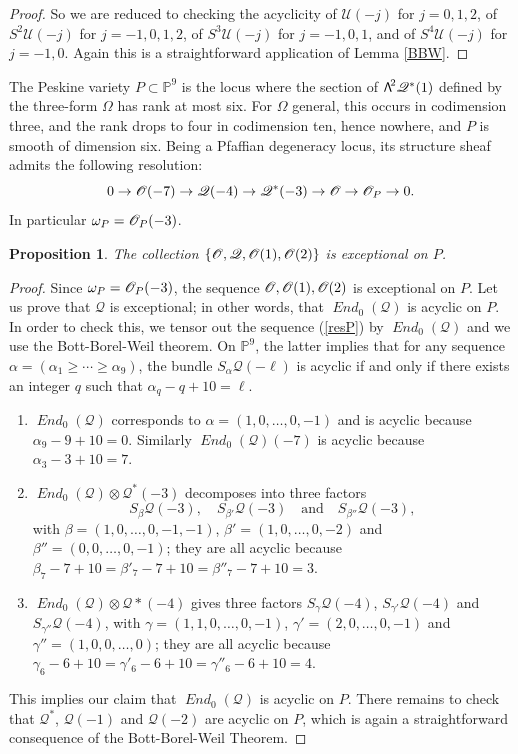 \documentclass[11pt]{article}
\newcommand\bw[1]{{\hbox{\large$\mathsf{\Lambda}$}^{\!#1}}}
\DeclareMathOperator{\iEnd}{\mathit{End}}
\let\mathcal\mathscr
\theoremstyle{plain}
\newtheorem{prop}[theorem]{Proposition}
\theoremstyle{definition}
\newcommand{\PP}{\mathbb{P}}
\newcommand{\sheaf}[1]{\mathcal{#1}}
\newcommand{\kq}{\sheaf{Q}}
\newcommand{\ku}{\sheaf{U}}
\begin{document}
\begin{proof}
So we are reduced to checking the acyclicity of $\ku(-j)$ for $j=0,1,2$, of $S^2\ku(-j)$
for $j=-1,0,1,2$, of $S^3\ku(-j)$ for $j=-1,0,1$, and of $S^4\ku(-j)$ for $j=-1,0$.
Again this is a straightforward application of Lemma \ref{BBW}.
\end{proof}

The Peskine variety $P\subset\PP^9$ is the locus where the section of $\bw2\kq^* (1)$
defined by the three-form $\Omega$ has rank at most six. For $\Omega$ general, this occurs
in codimension three, and the rank drops to four in codimension ten, hence nowhere, and
$P$ is smooth of dimension six. Being a Pfaffian degeneracy locus, its structure sheaf admits
the following resolution:\vspace*{-3pt}
\begin{equation*}\label{resP}
0\to \cO(-7)\to \kq(-4)\to \kq^* (-3)\to \cO\to\cO_P\to 0.
\end{equation*}
In particular $\omega_P=\cO_P(-3)$.

\begin{prop}\label{prop:exc-coll-on-P}
The collection $\{\cO, \kq, \cO(1), \cO(2)\}$ is exceptional on $P$.
\end{prop}

\begin{proof}
Since $\omega_P=\cO_P(-3)$, the sequence $\cO, \cO(1), \cO(2)$ is exceptional on $P$.
Let us prove that $\kq$ is exceptional; in other words, that $\iEnd_0(\kq)$ is acyclic on $P$.
In order to
check this, we tensor out the sequence (\ref{resP}) by $\iEnd_0(\kq)$ and we use
the Bott-Borel-Weil theorem. On $\PP^9$, the latter implies that for any sequence $\alpha
=(\alpha_1\ge\cdots\ge\alpha_9)$, the bundle $S_\alpha \kq (-\ell)$ is acyclic if and only if
there exists an integer $q$ such that $\alpha_{q}-q+10=\ell$.
\begin{enumerate}
\item $\iEnd_0(\kq)$ corresponds to $\alpha = (1,0,\dots,0,-1)$ and is acyclic because
$\alpha_{9}-9+10=0$. Similarly $\iEnd_0(\kq)(-7)$ is acyclic because $\alpha_3-3+10=7$.
\item $\iEnd_0(\kq)\otimes \kq^* (-3)$ decomposes into three factors\vspace*{-3pt}
\[
S_\beta \kq(-3),\quad S_{\beta'}\kq(-3)\quad\text{and}\quad S_{\beta''}\kq(-3),
\]
with $\beta = (1,0,\dots,0,-1,-1)$, $\beta' = (1,0,\dots,0,-2)$ and $\beta'' = (0,0,\dots,0,-1)$;
they are all acyclic because $\beta_7-7+10=\beta'_7-7+10=\beta''_7-7+10=3$.
\item $\iEnd_0(\kq)\otimes \kq* (-4)$ gives three factors $S_\gamma \kq(-4)$, $S_{\gamma'}\kq(-4)$
and $S_{\gamma''}\kq(-4)$,
with $\gamma = (1,1,0,\dots,0,-1)$, $\gamma' = (2,0,\dots,0,-1)$ and $\gamma'' = (1,0,0,\dots,0)$;
they are all acyclic because $\gamma_6-6+10=\gamma'_6-6+10=\gamma''_6-6+10=4$.
\end{enumerate}
This implies our claim that $\iEnd_0(\kq)$ is acyclic on $P$. There remains to check that
$\kq^*$, $\kq(-1)$ and $\kq(-2)$ are acyclic on $P$, which is again a straightforward
consequence of the Bott-Borel-Weil Theorem.
\end{proof}
\end{document}
